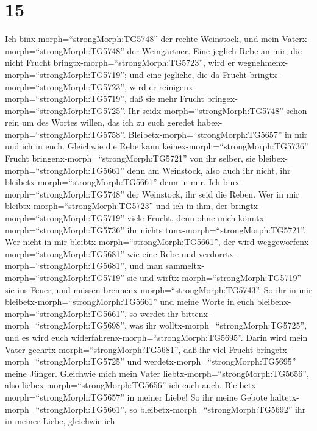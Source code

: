 \hypertarget{section-14}{%
\section{15}\label{section-14}}

 Ich binx-morph=``strongMorph:TG5748'' der rechte Weinstock,
und mein Vaterx-morph=``strongMorph:TG5748'' der Weingärtner.
 Eine jeglich Rebe an mir, die nicht Frucht
bringtx-morph=``strongMorph:TG5723'', wird er
wegnehmenx-morph=``strongMorph:TG5719''; und eine jegliche, die da
Frucht bringtx-morph=``strongMorph:TG5723'', wird er
reinigenx-morph=``strongMorph:TG5719'', daß sie mehr Frucht
bringex-morph=``strongMorph:TG5725''.  Ihr
seidx-morph=``strongMorph:TG5748'' schon rein um des Wortes willen, das
ich zu euch geredet habex-morph=``strongMorph:TG5758''. 
Bleibetx-morph=``strongMorph:TG5657'' in mir und ich in euch. Gleichwie
die Rebe kann keinex-morph=``strongMorph:TG5736'' Frucht
bringenx-morph=``strongMorph:TG5721'' von ihr selber, sie
bleibex-morph=``strongMorph:TG5661'' denn am Weinstock, also auch ihr
nicht, ihr bleibetx-morph=``strongMorph:TG5661'' denn in mir.
 Ich binx-morph=``strongMorph:TG5748'' der Weinstock, ihr
seid die Reben. Wer in mir bleibtx-morph=``strongMorph:TG5723'' und ich
in ihm, der bringtx-morph=``strongMorph:TG5719'' viele Frucht, denn ohne
mich könntx-morph=``strongMorph:TG5736'' ihr nichts
tunx-morph=``strongMorph:TG5721''.  Wer nicht in mir
bleibtx-morph=``strongMorph:TG5661'', der wird
weggeworfenx-morph=``strongMorph:TG5681'' wie eine Rebe und
verdorrtx-morph=``strongMorph:TG5681'', und man
sammeltx-morph=``strongMorph:TG5719'' sie und
wirftx-morph=``strongMorph:TG5719'' sie ins Feuer, und müssen
brennenx-morph=``strongMorph:TG5743''.  So ihr in mir
bleibetx-morph=``strongMorph:TG5661'' und meine Worte in euch
bleibenx-morph=``strongMorph:TG5661'', so werdet ihr
bittenx-morph=``strongMorph:TG5698'', was ihr
wolltx-morph=``strongMorph:TG5725'', und es wird euch
widerfahrenx-morph=``strongMorph:TG5695''.  Darin wird mein
Vater geehrtx-morph=``strongMorph:TG5681'', daß ihr viel Frucht
bringetx-morph=``strongMorph:TG5725'' und
werdetx-morph=``strongMorph:TG5695'' meine Jünger. 
Gleichwie mich mein Vater liebtx-morph=``strongMorph:TG5656'', also
liebex-morph=``strongMorph:TG5656'' ich euch auch.
Bleibetx-morph=``strongMorph:TG5657'' in meiner Liebe!  So
ihr meine Gebote haltetx-morph=``strongMorph:TG5661'', so
bleibetx-morph=``strongMorph:TG5692'' ihr in meiner Liebe, gleichwie ich
